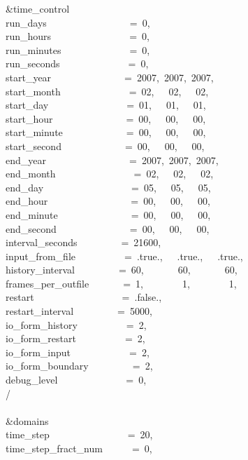 \&time\_control~~~~~~~~~~~~\\
run\_days~~~~~~~~~~~~~~~~~=~0,\\
run\_hours~~~~~~~~~~~~~~~~=~0,\\
run\_minutes~~~~~~~~~~~~~~=~0,\\
run\_seconds~~~~~~~~~~~~~~=~0,\\
start\_year~~~~~~~~~~~~~~~=~2007,~2007,~2007,\\
start\_month~~~~~~~~~~~~~~=~02,~~~02,~~~02,~~\\
start\_day~~~~~~~~~~~~~~~~=~01,~~~01,~~~01,~~\\
start\_hour~~~~~~~~~~~~~~~=~00,~~~00,~~~00,~~\\
start\_minute~~~~~~~~~~~~~=~00,~~~00,~~~00,~~\\
start\_second~~~~~~~~~~~~~=~00,~~~00,~~~00,~~\\
end\_year~~~~~~~~~~~~~~~~~=~2007,~2007,~2007,\\
end\_month~~~~~~~~~~~~~~~~=~02,~~~02,~~~02,~~\\
end\_day~~~~~~~~~~~~~~~~~~=~05,~~~05,~~~05,~~\\
end\_hour~~~~~~~~~~~~~~~~~=~00,~~~00,~~~00,~~\\
end\_minute~~~~~~~~~~~~~~~=~00,~~~00,~~~00,~~\\
end\_second~~~~~~~~~~~~~~~=~00,~~~00,~~~00,~~\\
interval\_seconds~~~~~~~~~=~21600,\\
input\_from\_file~~~~~~~~~~=~.true.,~~~.true.,~~~.true.,\\
history\_interval~~~~~~~~~=~60,~~~~~~~60,~~~~~~~60,\\
frames\_per\_outfile~~~~~~~=~1,~~~~~~~~1,~~~~~~~~1,\\
restart~~~~~~~~~~~~~~~~~~=~.false.,\\
restart\_interval~~~~~~~~~=~5000,\\
io\_form\_history~~~~~~~~~~=~2,\\
io\_form\_restart~~~~~~~~~~=~2,\\
io\_form\_input~~~~~~~~~~~~=~2,\\
io\_form\_boundary~~~~~~~~~=~2,\\
debug\_level~~~~~~~~~~~~~~=~0,\\
/\\
\\
\&domains~~~~~~~~~~~~~~~~~\\
time\_step~~~~~~~~~~~~~~~~=~20,\\
time\_step\_fract\_num~~~~~~=~0,\\

